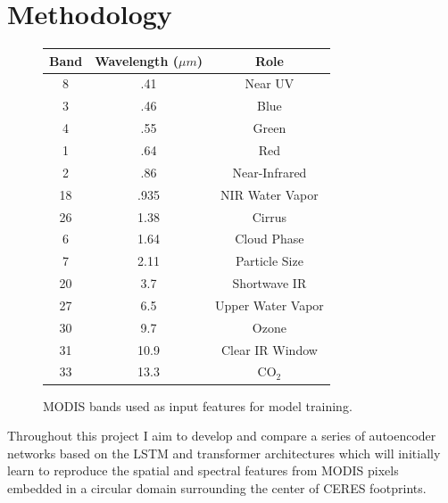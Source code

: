\documentclass[12pt]{article}
\begin{document}
\vspace{-1em}
\section{Methodology}
\vspace{-1em}

\begin{figure}
    \centering
    \begin{tabular}{| c c c |}
        Band & Wavelength ($\mu m$) & Role \\
        \hline
        8 & .41 & Near UV \\
        3 & .46 & Blue \\
        4 & .55 & Green \\
        1 & .64 & Red \\
        2 & .86 & Near-Infrared \\
        18 & .935 & NIR Water Vapor \\
        26 & 1.38 & Cirrus \\
        6 & 1.64 & Cloud Phase \\
        7 & 2.11 & Particle Size \\
        20 & 3.7 & Shortwave IR \\
        27 & 6.5 & Upper Water Vapor\\
        30 & 9.7 & Ozone \\
        31 & 10.9 & Clear IR Window \\
        33 & 13.3 & CO$_2$ \\
    \end{tabular}
    \caption{MODIS bands used as input features for model training.}
\end{figure}

Throughout this project I aim to develop and compare a series of autoencoder networks based on the LSTM and transformer architectures which will initially learn to reproduce the spatial and spectral features from MODIS pixels embedded in a circular domain surrounding the center of CERES footprints.
\end{document}
